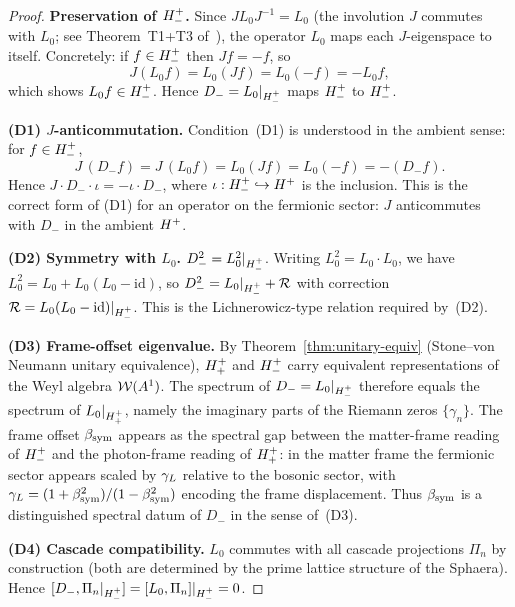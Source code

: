 \begin{proof}
\textbf{Preservation of $H^+_-$.}
Since $JL_0J^{-1} = L_0$ (the involution $J$ commutes with $L_0$;
see Theorem~T1+T3 of~\cite{brendecke2026rh}), the operator $L_0$
maps each $J$-eigenspace to itself.
Concretely: if $f\in H^+_-$ then $Jf = -f$, so
\[
  J(L_0 f) = L_0(Jf) = L_0(-f) = -L_0 f,
\]
which shows $L_0 f\in H^+_-$.
Hence $D_{-} = L_0|_{H^+_-}$ maps $H^+_-$ to $H^+_-$.

\smallskip
\noindent\textbf{(D1) $J$-anticommutation.}
Condition~(D1) is understood in the ambient sense: for $f\in H^+_-$,
\[
  J\,(D_{-}f) = J\,(L_0 f) = L_0(Jf) = L_0(-f) = -(D_{-}f).
\]
Hence $J\cdot D_{-}\cdot\iota = -\iota\cdot D_{-}$, where
$\iota:H^+_-\hookrightarrow H^+$ is the inclusion.
This is the correct form of (D1) for an operator on the fermionic
sector: $J$ anticommutes with $D_{-}$ in the ambient $H^+$.

\smallskip
\noindent\textbf{(D2) Symmetry with $L_0$.}
$D_{-}^2 = L_0^2|_{H^+_-}$.
Writing $L_0^2 = L_0\cdot L_0$, we have
$L_0^2 = L_0 + L_0(L_0-\mathrm{id})$,
so $D_{-}^2 = L_0|_{H^+_-} + \mathcal{R}$ with correction
$\mathcal{R} = L_0(L_0-\mathrm{id})|_{H^+_-}$.
This is the Lichnerowicz-type relation required by~(D2).

\smallskip
\noindent\textbf{(D3) Frame-offset eigenvalue.}
By Theorem~\ref{thm:unitary-equiv} (Stone--von Neumann unitary
equivalence), $H^+_+$ and $H^+_-$ carry equivalent
representations of the Weyl algebra $\mathcal{W}(A^1)$.
The spectrum of $D_{-} = L_0|_{H^+_-}$ therefore equals the
spectrum of $L_0|_{H^+_+}$, namely the imaginary parts of the
Riemann zeros $\{\gamma_n\}$.
The frame offset $\beta_{\mathrm{sym}}$ appears as the spectral gap between the
matter-frame reading of $H^+_-$ and the photon-frame reading
of $H^+_+$: in the matter frame the fermionic sector appears
scaled by $\gamma_L$ relative to the bosonic sector, with
$\gamma_L = (1+\beta_{\mathrm{sym}}^2)/(1-\beta_{\mathrm{sym}}^2)$ encoding the frame displacement.
Thus $\beta_{\mathrm{sym}}$ is a distinguished spectral datum of $D_{-}$ in the
sense of~(D3).

\smallskip
\noindent\textbf{(D4) Cascade compatibility.}
$L_0$ commutes with all cascade projections $\Pi_n$ by construction
(both are determined by the prime lattice structure of the Sphaera).
Hence $[D_{-},\Pi_n|_{H^+_-}] = [L_0,\Pi_n]|_{H^+_-} = 0$.
\end{proof}

